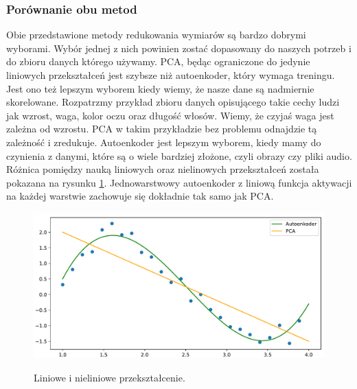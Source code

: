 \documentclass[a4paper,12pt]{book} %
\begin{document}
\subsubsection{Porównanie obu metod}
Obie przedstawione metody redukowania wymiarów są bardzo dobrymi wyborami. Wybór jednej z nich powinien zostać dopasowany do naszych potrzeb i do zbioru danych którego używamy. PCA, będąc ograniczone do jedynie liniowych przekształceń jest szybsze niż autoenkoder, który wymaga treningu. Jest ono też lepszym wyborem kiedy wiemy, że nasze dane są nadmiernie skorelowane. Rozpatrzmy przykład zbioru danych opisującego takie cechy ludzi jak wzrost, waga, kolor oczu oraz długość włosów. Wiemy, że czyjaś waga jest zależna od wzrostu. PCA w takim przykładzie bez problemu odnajdzie tą zależność i zredukuje. Autoenkoder jest lepszym wyborem, kiedy mamy do czynienia z danymi, które są o wiele bardziej złożone, czyli obrazy czy pliki audio. Różnica pomiędzy nauką liniowych oraz nielinowych przekształceń została pokazana na rysunku \ref{fig:pcavsautoenkoder}.  
Jednowarstwowy autoenkoder z liniową funkcja aktywacji na każdej warstwie zachowuje się dokładnie tak samo jak PCA.\cite{aevspca}
\begin{figure}[h!]
	\centering
	\includegraphics[width=14cm]{pcavsautoencoder.pdf}
	\label{fig:pcavsautoenkoder}
	\caption{Liniowe i nieliniowe przekształcenie.}
\end{figure}
\end{document}
